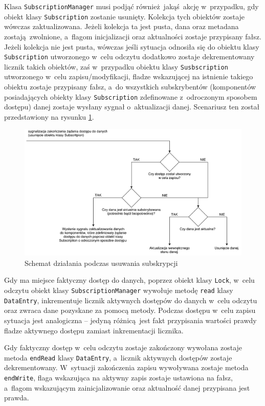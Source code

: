 Klasa \lstinline$SubscriptionManager$ musi podjąć również jakąś akcję w~przypadku, gdy obiekt klasy \lstinline$Subscription$ zostanie usunięty. Kolekcja tych obiektów zostaje wówczas zaktualizowana. Jeżeli kolekcja ta jest pusta, dana oraz metadana zostają zwolnione, a~flagom inicjalizacji oraz aktualności zostaje przypisany fałsz.
Jeżeli kolekcja nie jest pusta, wówczas jeśli sytuacja odnosiła się do obiektu klasy \lstinline$Subscription$ utworzonego w~celu odczytu dodatkowo zostaje dekrementowany licznik takich obiektów, zaś w~przypadku obiektu klasy \lstinline$Susbscription$ utworzonego w~celu zapisu/modyfikacji, fladze wskazującej na istnienie takiego obiektu zostaje przypisany fałsz, a~do wszystkich subskrybentów (komponentów posiadających obiekty klasy \lstinline$Subscription$ zdefinowane z~odroczonym sposobem dostępu) danej zostaje wysłany sygnał o~aktualizacji danej. Scenariusz ten został przedstawiony na rysunku \ref{fig:unsubscribe}.

\begin{figure}[ht]
	\centering
	\includegraphics[width=1\linewidth]{rys05/unsubscribe}
	\caption{Schemat działania podczas usuwania subskrypcji}
	\label{fig:unsubscribe}	
\end{figure}

Gdy ma miejsce faktyczny dostęp do danych, poprzez obiekt klasy \lstinline$Lock$, w~celu odczytu obiekt klasy \lstinline$SubscriptionManager$ wywołuje metodę \lstinline$read$ klasy \lstinline$DataEntry$, inkrementuje licznik aktywnych dostępów do danych w~celu odczytu oraz zwraca dane pozyskane za pomocą metody. Podczas dostępu w~celu zapisu sytuacja jest analogiczna -- jedyną różnicą jest fakt przypisania wartości prawdy fladze aktywnego dostępu zamiast inkrementacji licznika. 

Gdy faktyczny dostęp w~celu odczytu zostaje zakończony wywołana zostaje metoda \lstinline$endRead$ klasy \lstinline$DataEntry$, a~licznik aktywnych dostępów zostaje dekrementowany. W~sytuacji zakończenia zapisu wywoływana zostaje metoda \lstinline$endWrite$, flaga wskazująca na aktywny zapis zostaje ustawiona na fałsz, a~flagom wskazującym zainicjalizowanie oraz aktualność danej przypisana jest prawda.